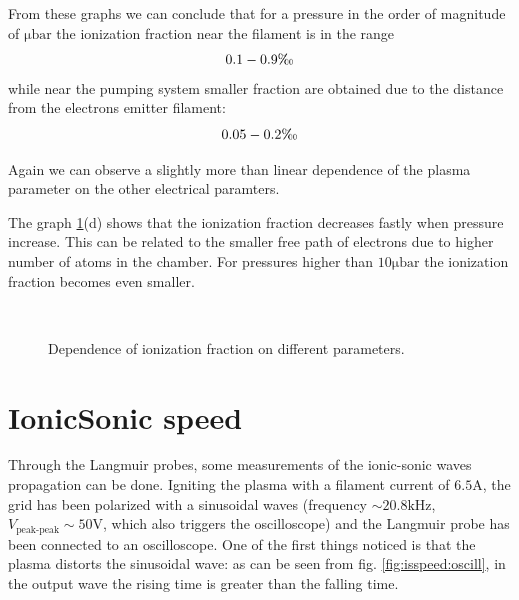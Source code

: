 \documentclass[11pt,a4 paper]{article}
\begin{document}
From these graphs we can conclude that for a pressure in the order of magnitude of $\si{\micro\bar}$ the ionization fraction near the filament is in the range
\[0.1-0.9\tcperthousand\]
while near the pumping system smaller fraction are obtained due to the distance from the electrons emitter filament:
\[0.05-0.2\tcperthousand\]

Again we can observe a slightly more than linear dependence of the plasma parameter on the other electrical paramters.

The graph \ref{fig:f}(d) shows that the ionization fraction decreases fastly when pressure increase. This can be related to the smaller free path of electrons due to higher number of atoms in the chamber. For pressures higher than $10\si{\micro\bar}$ the ionization fraction becomes even smaller.
%
\begin{figure}[H]
\\%
 \caption{Dependence of ionization fraction on different parameters.}\label{fig:f}%
\end{figure}

\section{IonicSonic speed}
Through the Langmuir probes, some measurements of the ionic-sonic waves propagation can be done. Igniting the plasma with a filament current of $6.5\si{\ampere}$, the grid has been polarized with a sinusoidal waves (frequency $\sim20.8\si{\kilo\hertz}$, $V_\text{peak-peak}\sim50\si{\volt}$, which also triggers the oscilloscope) and the Langmuir probe has been connected to an oscilloscope. One of the first things noticed is that the plasma distorts the sinusoidal wave: as can be seen from fig. \ref{fig:isspeed:oscill}, in the output wave the rising time is greater than the falling time.
\end{document}
